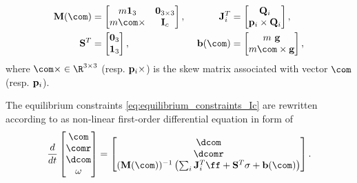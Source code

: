 \begin{align}
  \label{eq:matrix_linear}
  {\bf M}(\com) &=
  \begin{bmatrix}
    m \mathbf{1}_{3} & {\bf 0}_{3 \times 3} \\
    m \com \times & {\bf I}_c
  \end{bmatrix}
  ,\
  &{\bf J}_i^T &=
  \begin{bmatrix}
    {\bf Q}_i \\
    {\bf p}_i\times {\bf Q}_i
  \end{bmatrix},
  \\
  {\bf S}^T &=
  \begin{bmatrix}
    {\bf 0}_{3} \\
    \mathbf{1}_{3}
  \end{bmatrix}
  ,\
  &{\bf b}(\com) &=
  \begin{bmatrix}
    m\ {\bf g} \\
    m \com \times {\bf g}
  \end{bmatrix},
\end{align}
where $\com\times\in\R^{3 \times 3}$ (resp. ${\bf p}_i \times$) is the skew matrix associated with vector $\com$ (resp. ${\bf p}_i$).

The equilibrium constraints \eqref{eq:equilibrium_constraints_Ic} are rewritten according to \cite{boyd:tro:07} as non-linear first-order differential equation in form of
\begin{equation}
\label{eq:equilibrium_constraints_linear}
  \frac{d}{dt}
  \begin{bmatrix}
    \com \\
    \comr \\
    \dcom \\
    {\bf \omega}
  \end{bmatrix}
  =
  \begin{bmatrix}
    \dcom \\
    \dcomr \\
    ({\bf M}(\com))^{-1}\left(\sum_i {\bf J}_i^T \ff + {\bf S}^T \sigma + {\bf b}(\com) \right)
  \end{bmatrix}.
\end{equation}

